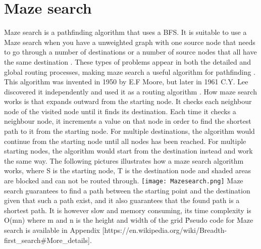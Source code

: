 \documentclass{kththesis}
\begin{document}
\section{Maze search}
Maze search is a pathfinding algorithm that uses a BFS. It is suitable to use a Maze search when you have a unweighted graph with one source node that needs to go through a number of destinations or a number of source nodes that all have the same destination \parencite{redbloggames}. These types of problems appear in both the detailed and global routing processes, making maze search a useful algorithm for pathfinding \parencite{EDA_routing}. This algorithm was invented in 1950 by E.F Moore, but later in 1961 C.Y. Lee discovered it independently and used it as a routing algorithm \parencite{idash}\parencite{lee}. 
How maze search works is that expands outward from the starting node. It checks each neighbour node of the visited node until it finds its destination. Each time it checks a neighbour node, it increments a value on that node in order to find the shortest path to it from the starting node. For multiple destinations, the algorithm would continue from the starting node until all nodes has been reached. For multiple starting nodes, the algorithm would start from the destination instead and work the same way. The following pictures illustrates how a maze search algorithm works, where S is the starting node, T is the destination node and shaded areas are blocked and can not be routed through.
\texttt{[image: Mazesearch.png]}
Maze search guarantees to find a path between the starting point and the destination given that such a path exist, and it also guarantees that the found path is a shortest path. It is however slow and memory consuming, its time complexity is O(mn) where m and n is the height and width of the grid \. 
Pseudo code for Maze search is available in Appendix [https://en.wikipedia.org/wiki/Breadth-first_search#More_details]. 
\end{document}
